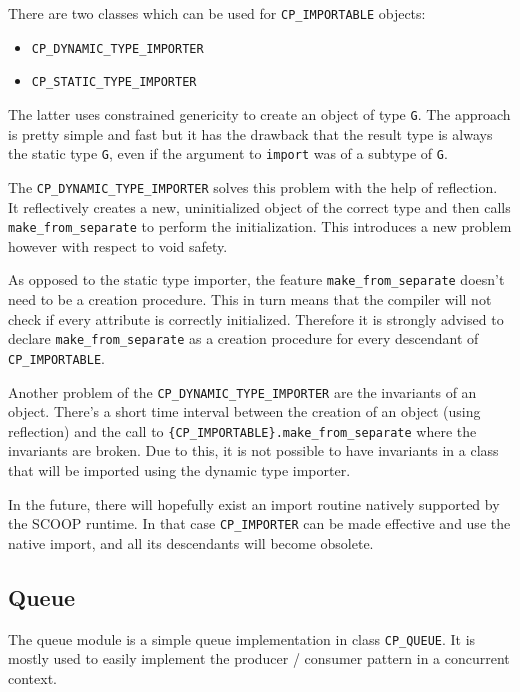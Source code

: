 There are two classes which can be used for \lstinline!CP_IMPORTABLE! objects: 
\begin{itemize}
 \item \lstinline!CP_DYNAMIC_TYPE_IMPORTER!
 \item \lstinline!CP_STATIC_TYPE_IMPORTER!
\end{itemize}
The latter uses constrained genericity to create an object of type \lstinline!G!.
The approach is pretty simple and fast but it has the drawback that the result type is always the static type \lstinline!G!, even if the argument to \lstinline!import! was of a subtype of \lstinline!G!.

The \lstinline!CP_DYNAMIC_TYPE_IMPORTER! solves this problem with the help of reflection.
It reflectively creates a new, uninitialized object of the correct type and then calls \lstinline!make_from_separate! to perform the initialization.
This introduces a new problem however with respect to void safety.

As opposed to the static type importer, the feature \lstinline!make_from_separate! doesn't need to be a creation procedure.
This in turn means that the compiler will not check if every attribute is correctly initialized.
Therefore it is strongly advised to declare \lstinline!make_from_separate! as a creation procedure for every descendant of \lstinline!CP_IMPORTABLE!.

Another problem of the \lstinline!CP_DYNAMIC_TYPE_IMPORTER! are the invariants of an object.
There's a short time interval between the creation of an object (using reflection) and the call to \lstinline!{CP_IMPORTABLE}.make_from_separate! where the invariants are broken.
Due to this, it is not possible to have invariants in a class that will be imported using the dynamic type importer.

In the future, there will hopefully exist an import routine natively supported by the SCOOP runtime.
In that case \lstinline!CP_IMPORTER! can be made effective and use the native import, and all its descendants will become obsolete.

\subsection{Queue}

The queue module is a simple queue implementation in class \lstinline!CP_QUEUE!.
It is mostly used to easily implement the producer / consumer pattern in a concurrent context.

